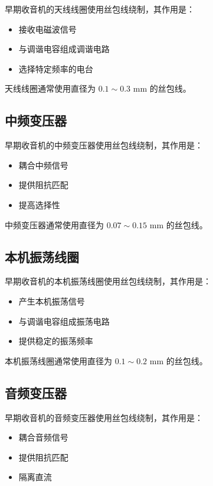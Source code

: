 \documentclass[12pt,UTF8]{ctexbook}
\begin{document}
早期收音机的天线线圈使用丝包线绕制，其作用是：

\begin{itemize}[leftmargin=2cm]
    \item 接收电磁波信号
    \item 与调谐电容组成调谐电路
    \item 选择特定频率的电台
\end{itemize}

天线线圈通常使用直径为 $0.1 \sim 0.3$ mm 的丝包线。

\subsection{中频变压器}

早期收音机的中频变压器使用丝包线绕制，其作用是：

\begin{itemize}[leftmargin=2cm]
    \item 耦合中频信号
    \item 提供阻抗匹配
    \item 提高选择性
\end{itemize}

中频变压器通常使用直径为 $0.07 \sim 0.15$ mm 的丝包线。

\subsection{本机振荡线圈}

早期收音机的本机振荡线圈使用丝包线绕制，其作用是：

\begin{itemize}[leftmargin=2cm]
    \item 产生本机振荡信号
    \item 与调谐电容组成振荡电路
    \item 提供稳定的振荡频率
\end{itemize}

本机振荡线圈通常使用直径为 $0.1 \sim 0.2$ mm 的丝包线。

\subsection{音频变压器}

早期收音机的音频变压器使用丝包线绕制，其作用是：

\begin{itemize}[leftmargin=2cm]
    \item 耦合音频信号
    \item 提供阻抗匹配
    \item 隔离直流
\end{itemize}
\end{document}

